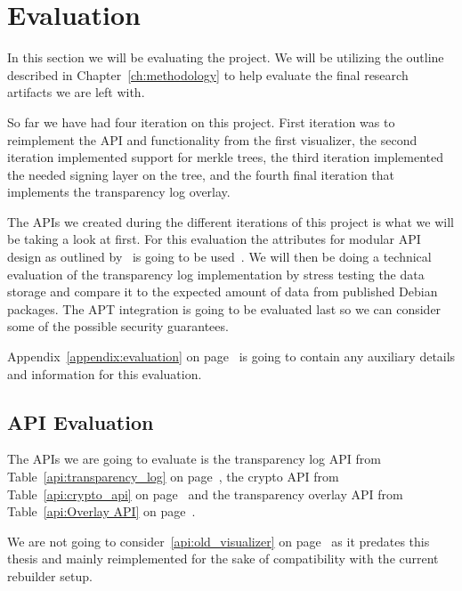 \documentclass[../Main/thesis.tex]{subfiles}
\begin{document}
\chapter{Evaluation}%
\label{ch:evaluation}
In this section we will be evaluating the project. We will be utilizing the
outline described in Chapter~\ref{ch:methodology} to help evaluate the final
research artifacts we are left with.

So far we have had four iteration on this project. First iteration was to
reimplement the API and functionality from the first visualizer, the second
iteration implemented support for merkle trees, the third iteration implemented
the needed signing layer on the tree, and the fourth final iteration that
implements the transparency log overlay.

The APIs we created during the different iterations of this project is what we
will be taking a look at first. For this evaluation the attributes for modular
API design as outlined by~\citeauthor{Iyer:2012:EAC:2342209.2342213} is going to
be used~\cite{Iyer:2012:EAC:2342209.2342213}. We will then be doing a technical
evaluation of the transparency log implementation by stress testing the data
storage and compare it to the expected amount of data from published Debian
packages. The APT integration is going to be evaluated last so we can consider
some of the possible security guarantees.

Appendix~\ref{appendix:evaluation} on page~\pageref{appendix:evaluation} is
going to contain any auxiliary details  and information for this evaluation.


\section{API Evaluation}%
\label{sec:api_evaluation}
The APIs we are going to evaluate is the transparency log API from
Table~\ref{api:transparency_log} on page~\pageref{api:transparency_log}, the
crypto API from Table~\ref{api:crypto_api} on page~\pageref{api:crypto_api} and
the transparency overlay API from Table~\ref{api:Overlay API} on
page~\pageref{api:Overlay API}.

We are not going to consider~\ref{api:old_visualizer} on
page~\pageref{api:old_visualizer} as it predates this thesis and mainly
reimplemented for the sake of compatibility with the current rebuilder setup.
\end{document}
